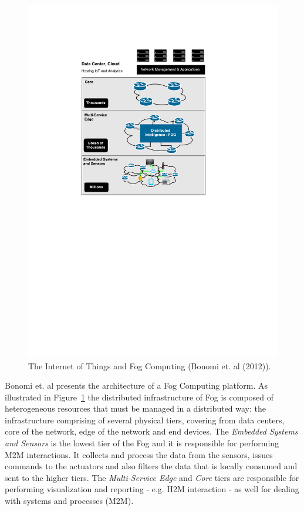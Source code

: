 \begin{figure}[ht!]
  \centering
  \includegraphics[width=.8\textwidth]{./images/fog_architecture}
  \caption[IoT and Fog Computing.]{The Internet of Things and Fog Computing (Bonomi et. al (2012)).}
  \label{fig:fog_architecture}
\end{figure}

Bonomi et. al \cite{bonomi2012fog} presents the architecture of a Fog Computing platform. As illustrated
in Figure~\ref{fig:fog_architecture} the distributed infrastructure of Fog is composed of heterogeneous
resources that must be managed in a distributed way: the infrastructure comprising of several physical tiers,
covering from data centers, core of the network, edge of the network and end devices. The \textit{Embedded Systems and Sensors}
is the lowest tier of the Fog and it is responsible for performing \gls{M2M} interactions. It collects and
process the data from the sensors, issues commands to the actuators and also filters the data that
is locally consumed and sent to the higher tiers. The \textit{Multi-Service Edge} and \textit{Core}
tiers are responsible for performing visualization and reporting - e.g. \gls{H2M} interaction -
as well for dealing with systems and processes (\gls{M2M}).\\

